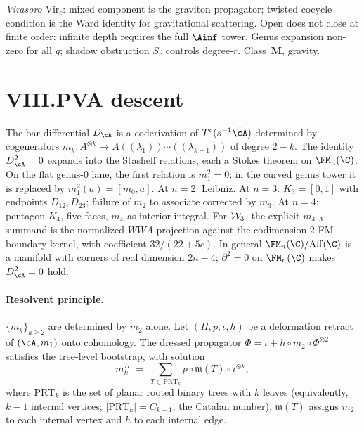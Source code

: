 \smallskip\emph{Virasoro} $\mathrm{Vir}_c$:
mixed component is the graviton propagator; twisted cocycle
condition is the Ward identity for gravitational scattering.
Open does not close at finite order: infinite depth requires
the full $\Ainf$ tower. Genus expansion non-zero for all $g$;
shadow obstruction $S_r$ controls degree-$r$. Class~$\mathbf{M}$,
gravity.

\section*{VIII.\quad PVA descent}

The bar differential $D_\cA$ is a coderivation of
$T^c(s^{-1}\bar\cA)$ determined by cogenerators
$m_k\colon A^{\otimes k} \to A((\lambda_1))\cdots((\lambda_{k-1}))$
of degree $2 - k$. The identity $D_\cA^2 = 0$ expands into the
Stasheff relations, each a Stokes theorem on $\FM_n(\C)$. On the
flat genus-$0$ lane, the first relation is $m_1^2=0$; in the curved
genus tower it is replaced by $m_1^2(a)=[m_0,a]$. At $n = 2$:
Leibniz. At $n = 3$:
$K_3 = [0,1]$ with endpoints $D_{12}, D_{23}$; failure of $m_2$
to associate corrected by $m_3$. At $n = 4$: pentagon $K_4$, five
faces, $m_4$ as interior integral. For $\mathcal{W}_3$, the explicit
$m_{4,\Lambda}$ summand is the normalized $WW\Lambda$ projection
against the codimension-$2$ FM boundary kernel, with coefficient
$32/(22+5c)$. In general $\FM_n(\C)/\mathrm{Aff}(\C)$
is a manifold with corners of real dimension $2n - 4$;
$\partial^2 = 0$ on $\FM_n(\C)$ makes $D_\cA^2 = 0$ hold.

\paragraph{Resolvent principle.}
$\{m_k\}_{k\ge 2}$ are determined by $m_2$ alone. Let
$(H, p, \iota, h)$ be a deformation retract of $(\cA, m_1)$ onto
cohomology. The dressed propagator
$\Phi = \iota + h \circ m_2 \circ \Phi^{\otimes 2}$ satisfies
the tree-level bootstrap, with solution
\[
m_k^H \;=\; \sum_{T \in \mathrm{PRT}_k}
p \circ \mathfrak{m}(T) \circ \iota^{\otimes k},
\]
where $\mathrm{PRT}_k$ is the set of planar rooted binary trees
with $k$ leaves (equivalently, $k - 1$ internal vertices;
$|\mathrm{PRT}_k| = C_{k-1}$, the Catalan number),
$\mathfrak{m}(T)$ assigns $m_2$ to each internal vertex and $h$
to each internal edge.

